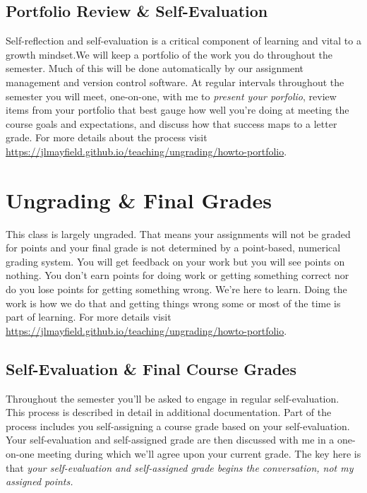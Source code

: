 \documentclass[10pt]{article}
\begin{document}
\subsection*{Portfolio Review \& Self-Evaluation}

Self-reflection and self-evaluation is a critical component of learning and vital to a growth mindset.We will keep a portfolio of the work you do throughout the semester. Much of this will be done automatically by our assignment management and version control software. At regular intervals throughout the semester you will meet, one-on-one, with me to \textit{present your porfolio}, review items from your portfolio that best gauge how well you're doing at meeting the course goals and expectations, and discuss how that success maps to a letter grade. For more details about the process visit \url{https://jlmayfield.github.io/teaching/ungrading/howto-portfolio}.



\section{Ungrading \& Final Grades}

This class is largely ungraded. That means your assignments will not be graded for points and your final grade
is not determined by a point-based, numerical grading system. You will get feedback on your work but you will
see points on nothing. You don't earn points for doing work or getting something correct nor do you lose points
for getting something wrong. We're here to learn. Doing the work is how we do that and getting things wrong
some or most of the time is part of learning. For more details visit \url{https://jlmayfield.github.io/teaching/ungrading/howto-portfolio}.

\subsection{Self-Evaluation \& Final Course Grades}

Throughout the semester you'll be asked to engage in regular self-evaluation. This process is described in
detail in additional documentation. Part of the process includes you self-assigning a course grade based on
your self-evaluation. Your self-evaluation and self-assigned grade are then discussed with me in a one-on-one
meeting during which we'll agree upon your current grade. The key here is that \textit{your self-evaluation
and self-assigned grade begins the conversation, not my assigned points.}
\end{document}

